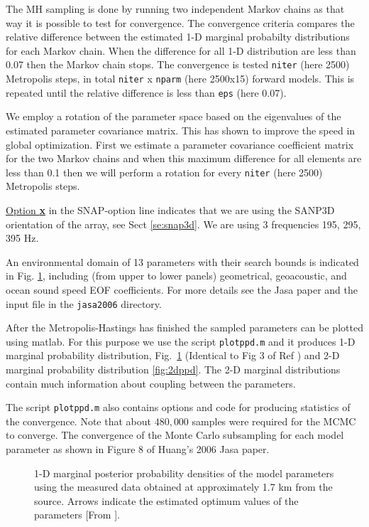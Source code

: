 \documentclass{saclantc}
\begin{document}
 The MH sampling is done by running two independent Markov chains as that way it is possible to test for convergence. The convergence criteria compares the relative difference between the estimated 1-D marginal probabilty distributions for each Markov chain. When the difference for all 1-D distribution are less than 0.07 then the Markov chain stops. The convergence is tested {\tt niter} (here 2500) Metropolis steps, in total {\tt niter} x {\tt nparm} (here 2500x15) forward models. This is repeated until the relative difference is less than {\tt eps} (here 0.07).
 
 We employ a rotation of the parameter space based on the eigenvalues of the estimated parameter covariance matrix. This has shown to improve the speed in global optimization. First we estimate a parameter covariance coefficient matrix for the two  Markov chains and when this maximum difference for all elements are less than 0.1 then we will perform a rotation for every  {\tt niter} (here 2500) Metropolis steps.


\underline{Option {\bf x}} in the {\sf SNAP}-option
line indicates that we are using the SANP3D orientation of the array, see Sect \ref{se:snap3d}.  We are using 3 frequencies   195, 295, 395 Hz. 

An environmental domain of 13 parameters with their search
bounds is indicated in Fig. \ref{fig:1ppd}, including
(from upper to lower panels) geometrical, geoacoustic, and
ocean sound speed EOF coefficients. For more details see the Jasa paper \cite{huang06} and the input file in the {\tt jasa2006} directory.

After the Metropolis-Hastings has finished the sampled parameters can be plotted using {\sc matlab}. For this purpose we use the script {\tt plotppd.m} and it produces 1-D marginal probability distribution, Fig.\ \ref{fig:1ppd} (Identical to Fig 3 of Ref \cite{huang06}) and  2-D marginal probability distribution \ref{fig:2dppd}.  The 2-D marginal distributions contain much information about coupling between the parameters.

The script {\tt plotppd.m} also contains options and code for producing statistics of the convergence. Note that about $480,000$
samples were required for the MCMC to converge.
The convergence of
the Monte Carlo subsampling for each model parameter as shown in Figure 8 of Huang's 2006 Jasa paper. 

\begin{figure}
\epsfxsize=12cm
\centerline{}
\caption{1-D marginal posterior probability densities of
the model parameters using the measured data obtained at
approximately 1.7 km from the source. Arrows indicate the
estimated optimum values of the parameters [From \cite{huang06}].}
\label{fig:1ppd}
\end{figure}
\end{document}
